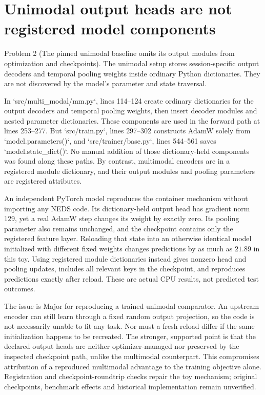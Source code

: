 \documentclass[10pt]{article}
\begin{document}
\section*{Unimodal output heads are not registered model components}
Problem 2 (The pinned unimodal baseline omits its output modules from optimization and checkpoints).  The unimodal setup stores session-specific output decoders and temporal pooling weights inside ordinary Python dictionaries. They are not discovered by the model’s parameter and state traversal.\par
In `src/multi\_modal/mm.py`, lines 114–124 create ordinary dictionaries for the output decoders and temporal pooling weights, then insert decoder modules and nested parameter dictionaries. These components are used in the forward path at lines 253–277. But `src/train.py`, lines 297–302 constructs AdamW solely from `model.parameters()`, and `src/trainer/base.py`, lines 544–561 saves `model.state\_dict()`. No manual addition of those dictionary-held components was found along these paths. By contrast, multimodal encoders are in a registered module dictionary, and their output modules and pooling parameters are registered attributes.\par
An independent PyTorch model reproduces the container mechanism without importing any NEDS code. Its dictionary-held output head has gradient norm \(129\), yet a real AdamW step changes its weight by exactly zero. Its pooling parameter also remains unchanged, and the checkpoint contains only the registered feature layer. Reloading that state into an otherwise identical model initialized with different fixed weights changes predictions by as much as \(21.89\) in this toy. Using registered module dictionaries instead gives nonzero head and pooling updates, includes all relevant keys in the checkpoint, and reproduces predictions exactly after reload. These are actual CPU results, not predicted test outcomes.\par
The issue is Major for reproducing a trained unimodal comparator. An upstream encoder can still learn through a fixed random output projection, so the code is not necessarily unable to fit any task. Nor must a fresh reload differ if the same initialization happens to be recreated. The stronger, supported point is that the declared output heads are neither optimizer-managed nor preserved by the inspected checkpoint path, unlike the multimodal counterpart. This compromises attribution of a reproduced multimodal advantage to the training objective alone. Registration and checkpoint-roundtrip checks repair the toy mechanism; original checkpoints, benchmark effects and historical implementation remain unverified.\par
\end{document}
